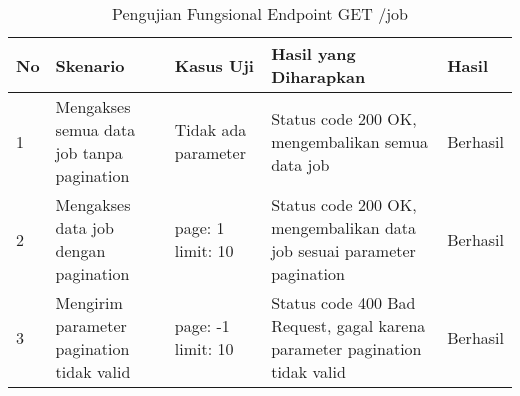 \begin{table}[H]
    \centering
    \begin{tabular}{|p{0.5cm}|p{3cm}|p{5cm}|p{5cm}|p{1.5cm}|}
        \hline
        \rowcolor[HTML]{DAE8FC} 
        \textbf{No} & \textbf{Skenario} & \textbf{Kasus Uji} & \textbf{Hasil yang Diharapkan} & \textbf{Hasil} \\ \hline
        1 & Mengakses semua data job tanpa pagination & 
        Tidak ada parameter & 
        Status code 200 OK, mengembalikan semua data job & 
        Berhasil \\ \hline
        2 & Mengakses data job dengan pagination & 
        page: 1 \newline limit: 10 & 
        Status code 200 OK, mengembalikan data job sesuai parameter pagination & 
        Berhasil \\ \hline
        3 & Mengirim parameter pagination tidak valid & 
        page: -1 \newline limit: 10 & 
        Status code 400 Bad Request, gagal karena parameter pagination tidak valid & 
        Berhasil \\ \hline
    \end{tabular}
    \caption{Pengujian Fungsional Endpoint GET /job}
    \label{tab:job_getall_testing}
\end{table}
